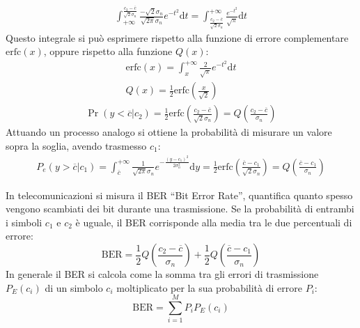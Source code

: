\documentclass{article}
\newcommand{\df}{\mathrm{d}}
\numberwithin{equation}{subsection}
\begin{document}
\begin{gather*}
    \displaystyle\int_{+\infty}^{\frac{c_2-\overline{c}}{\sqrt2\sigma_n}}\frac{-\sqrt2\sigma_n}{\sqrt{2\pi}\sigma_n}e^{-t^2}\df t=\int_{\frac{c_2-\overline{c}}{\sqrt2\sigma_n}}^{+\infty}\frac{e^{-t^2}}{\sqrt\pi}\df t
\end{gather*}
Questo integrale si può esprimere rispetto alla funzione di errore complementare $\mathrm{erfc}(x)$, oppure rispetto alla funzione $Q(x)$:
\begin{gather}
    \mathrm{erfc}(x)=\displaystyle\int_{x}^{+\infty}\frac{2}{\sqrt\pi}e^{-t^2}{\df t}\\
    Q(x)=\displaystyle\frac{1}{2}\mathrm{erfc}\left(\frac{x}{\sqrt2}\right)
\end{gather}
\begin{gather*}
    \Pr(y<\overline{c}|c_2)=\displaystyle\frac{1}{2}\mathrm{erfc}\left(\frac{c_2-\overline{c}}{\sqrt{2}\sigma_n}\right)=Q\left(\frac{c_2-\overline{c}}{\sigma_n}\right)
\end{gather*}
Attuando un processo analogo si ottiene la probabilità di misurare un valore sopra la soglia, avendo trasmesso $c_1$:
\begin{gather*}
    P_e(y>\overline{c}|c_1)=\int_{\overline{c}}^{+\infty}\frac{1}{\sqrt{2\pi}\sigma_n}e^{-\frac{(y-c_1)^2}{2\sigma_n^2}}\df y=\frac{1}{2}\mathrm{erfc}\left(\frac{\overline{c}-c_1}{\sqrt{2}\sigma_n}\right)=Q\left(\frac{\overline{c}-c_1}{\sigma_n}\right)
\end{gather*}

In telecomunicazioni si misura il BER ``Bit Error Rate'', quantifica quanto spesso vengono scambiati dei bit durante una trasmissione. Se la probabilità di entrambi 
i simboli $c_1$ e $c_2$ è uguale, il BER corrisponde alla media tra le due percentuali di errore:
\begin{equation*}
    \mathrm{BER}=\displaystyle\frac{1}{2}Q\left(\frac{c_2-\overline{c}}{\sigma_n}\right)+\frac{1}{2}Q\left(\frac{\overline{c}-c_1}{\sigma_n}\right)
\end{equation*}
In generale il BER si calcola come la somma tra gli errori di trasmissione $P_E(c_i)$ di un simbolo $c_i$ moltiplicato per la sua probabilità di errore $P_i$:
\begin{equation*}
    \mathrm{BER}=\displaystyle\sum_{i=1}^MP_{i}P_E(c_i)
\end{equation*}
\end{document}
